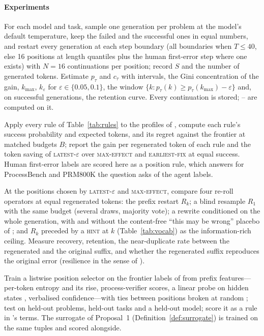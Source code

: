 \documentclass[10pt,a4paper]{article}
\begin{document}
\paragraph{Experiments}
\begin{description}[leftmargin=1.4em,style=nextline,itemsep=1pt]
\item[\EXP{5.1} --- The restart profile (answers \RQ{5.1}, \RQ{5.3}).] For each model and task, sample one generation per problem at the model's default temperature, keep the failed and the successful ones in equal numbers, and restart every generation at each step boundary (all boundaries when $T\le40$, else 16 positions at length quantiles plus the human first-error step where one exists) with $N=16$ continuations per position; record $S$ and the number of generated tokens. Estimate $p_\tau$ and $c_\tau$ with intervals, the Gini concentration of the gain, $k_{\max}$, $k_\varepsilon$ for $\varepsilon\in\{0.05,0.1\}$, the window $\{k:p_\tau(k)\ge p_\tau(k_{\max})-\varepsilon\}$ and, on successful generations, the retention curve. Every continuation is stored; -- are computed on it.
\item[\EXP{5.2} --- Rules against the frontier (answers \RQ{5.2}).] Apply every rule of Table~\ref{tab:rules} to the profiles of , compute each rule's success probability and expected tokens, and its regret against the frontier at matched budgets $B$; report the gain per regenerated token of each rule and the token saving of \textsc{latest-}$\varepsilon$ over \textsc{max-effect} and \textsc{earliest-fix} at equal success. Human first-error labels are scored here as a position rule, which answers for ProcessBench and PRM800K the question  asks of the agent labels.
\item[\EXP{5.3} --- Operators at matched tokens (answers \RQ{5.4}).] At the positions chosen by \textsc{latest-}$\varepsilon$ and \textsc{max-effect}, compare four re-roll operators at equal regenerated tokens: the prefix restart $R_k$; a blind resample $R_1$ with the same budget (several draws, majority vote); a rewrite conditioned on the whole generation, with and without the content-free ``this may be wrong'' placebo of \citet{verma2026tryagain}; and $R_k$ preceded by a \textsc{hint} at $k$ (Table~\ref{tab:vocab}) as the information-rich ceiling. Measure recovery, retention, the near-duplicate rate between the regenerated and the original suffix, and whether the regenerated suffix reproduces the original error (resilience in the sense of \citet{macar2025thoughtbranches}).
\item[\EXP{5.4} --- Predicting the position (answers \RQ{5.5}).] Train a listwise position selector on the frontier labels of  from prefix features---per-token entropy and its rise, process-verifier scores, a linear probe on hidden states \cite{yuan2026hiddenerror}, verbalised confidence---with ties between positions broken at random \cite{atri2026expanding}; test on held-out problems, held-out tasks and a held-out model; score it as a rule in 's terms. The surrogate of Proposal~1 (Definition~\ref{def:surrogate}) is trained on the same tuples and scored alongside.

\end{description}
\end{document}
